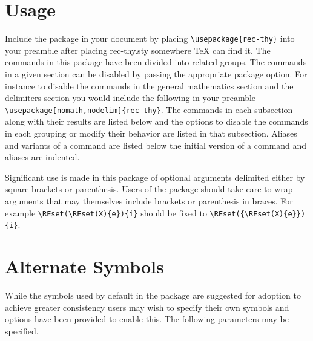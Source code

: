 \documentclass[leqno,11pt]{amsart}
\begin{document}
\section{Usage}
Include the package in your document by placing \verb=\usepackage{rec-thy}= into your preamble after placing rec-thy.sty somewhere \TeX{ } can find it.  The commands in this package have been divided into related groups.  The commands in a given section can be disabled by passing the appropriate package option.  For instance to disable the commands in the general mathematics section and the delimiters section you would include the following in your preamble \verb=\usepackage[nomath,nodelim]{rec-thy}=.  The commands in each subsection along with their results are listed below and the options to disable the commands in each grouping or modify their behavior are listed in that subsection.  Aliases and variants of a command are listed below the initial version of a command and aliases are indented.

Significant use is made in this package of optional arguments delimited either by square brackets or parenthesis.  Users of the package should take care to wrap arguments that may themselves include brackets or parenthesis in braces.  For example \verb=\REset(\REset(X){e}){i}= should be fixed to \verb=\REset({\REset(X){e}}){i}=.

\section{Alternate Symbols}
While the symbols used by default in the package are suggested for adoption to achieve greater consistency users may wish to specify their own symbols and options have been provided to enable this.  The following parameters may be specified.

\makeatletter
\let\useSYMdefault=\@recthy@useSYM@default
\makeatother
\end{document}

